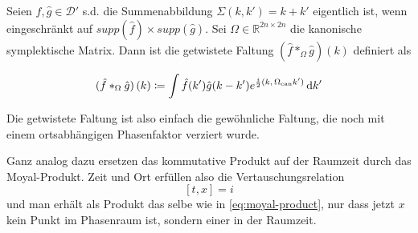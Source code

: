 \begin{definition}
\label{def:twisted_convolution}
    Seien $\hat f,\hat g \in \mathcal{D}'$ s.d. die Summenabbildung \(\Sigma(k,k') = k + k'\) eigentlich \cite{Bourbaki1998} ist, wenn eingeschränkt auf \(supp (\hat f) \times supp(\hat g)\). Sei $\Omega \in \mathbb{R}^{2n \times 2n}$ die kanonische symplektische Matrix. Dann ist die getwistete Faltung $(\hat f \ast_\Omega \hat g) (k)$ definiert als

    \begin{equation}
        (\hat f \ast_\Omega \hat g) \,(k) \coloneqq
        \int \hat f(k') \hat g(k-k')e^{\frac{i}{2} (k,\,\Omega_{\mathrm{can}} k')} \mathop{}\!\mathrm{d} k'
    \end{equation}

    Die getwistete Faltung ist also einfach die gewöhnliche Faltung, die noch mit einem ortsabhängigen Phasenfaktor verziert wurde.
\end{definition}

Ganz analog dazu ersetzen \textcite{Doplicher1995} das kommutative Produkt auf der Raumzeit durch das Moyal-Produkt. Zeit und Ort erfüllen also die Vertauschungsrelation
\begin{equation*}
    \left[t,x\right] = i
\end{equation*}
und man erhält als Produkt das selbe wie in \cref{eq:moyal-product}, nur dass jetzt $x$ kein Punkt im Phasenraum ist, sondern einer in der Raumzeit.






